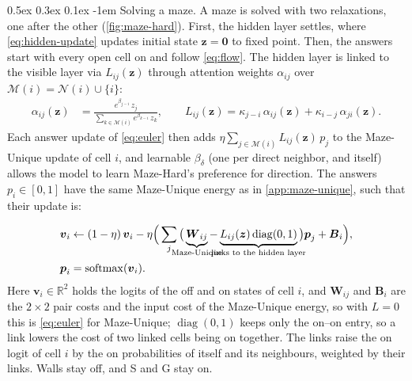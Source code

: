 \documentclass{article}
\makeatletter
\newif\ifmathcolors
\newcommand{\role}[2]{\ifmathcolors{\color{#1}#2}\else{#2}\fi}
\newcommand{\state}[1]{\role{StateColor}{#1}}
\newcommand{\coupling}[1]{\role{CouplingColor}{#1}}
\newcommand{\note}[1]{\text{\scriptsize #1}}
\newcommand{\term}[2]{\underbrace{#1}_{\mathclap{\note{#2}}}}
\newcommand{\softmax}{\operatorname{softmax}}
\newcommand{\R}{\mathbb{R}}
\newcommand{\vect}[1]{\boldsymbol{#1}}
\newcommand{\logits}{\state{\vect v}}
\newcommand{\belief}{\state{\vect p}}
\newcommand{\symcost}{\coupling{W}}
\newcommand{\inputcost}{\coupling{B}}
\renewcommand{\paragraph}{%
  \@startsection{paragraph}{4}{\z@}%
                {0.5ex \@plus 0.3ex \@minus 0.1ex}%
                {-1em}%
                {\normalsize\bf}%
}
\makeatother
\begin{document}
\paragraph{Solving a maze.}
A maze is solved with two relaxations, one after the other (\cref{fig:maze-hard}).
First, the hidden layer settles, where \cref{eq:hidden-update} updates initial state $\state{\vect z}=\vect 0$ to fixed point.
Then, the answers start with every open cell on and follow \cref{eq:flow}.
The hidden layer is linked to the visible layer via $\coupling{L}_{ij}(\state{\vect z})$ through attention weights $\alpha_{ij}$ over $\mathcal M(i)=\mathcal N(i)\cup\{i\}$:
\begin{equation}
\begin{aligned}
\alpha_{ij}(\state{\vect z})&=\frac{e^{\coupling{\beta}_{j-i}}\,\state{z}_j}{\sum_{k\in\mathcal M(i)}e^{\coupling{\beta}_{k-i}}\,\state{z}_k},\qquad
\coupling{L}_{ij}(\state{\vect z})=\coupling{\kappa}_{j-i}\,\alpha_{ij}(\state{\vect z})+\coupling{\kappa}_{i-j}\,\alpha_{ji}(\state{\vect z}).
\end{aligned}
\label{eq:hidden-attention}
\end{equation}
Each answer update of \cref{eq:euler} then adds $\eta\sum_{j\in\mathcal M(i)}\coupling{L}_{ij}(\state{\vect z})\,\state{p}_j$ to the Maze-Unique update of cell $i$, and learnable $\coupling{\beta}_\delta$ (one per direct neighbor, and itself) allows the model to learn Maze-Hard's preference for direction.
The answers $\state{p}_i\in[0,1]$ have the same Maze-Unique energy as in \cref{app:maze-unique}, such that their update is:

\begin{equation}
\begin{aligned}
\logits_i&\leftarrow(1-\eta)\,\logits_i
-\eta\Big(\sum_j\big(\term{\vect{\symcost}_{ij}}{Maze-Unique}-\term{\coupling{L}_{ij}(\state{\vect z})\operatorname{diag}(0,1)}{links to the hidden layer}\big)\belief_j+\vect{\inputcost}_i\Big),\\
\belief_i&=\softmax(\logits_i).
\end{aligned}
\label{eq:hidden-answer-update}
\end{equation}
Here $\logits_i\in\R^2$ holds the logits of the off and on states of cell $i$, and $\vect{\symcost}_{ij}$ and $\vect{\inputcost}_i$ are the $2\times2$ pair costs and the input cost of the Maze-Unique energy, so with $\coupling{L}=0$ this is \cref{eq:euler} for Maze-Unique; $\operatorname{diag}(0,1)$ keeps only the on--on entry, so a link lowers the cost of two linked cells being on together.
The links raise the on logit of cell $i$ by the on probabilities of itself and its neighbours, weighted by their links.
Walls stay off, and S and G stay on.
\end{document}
